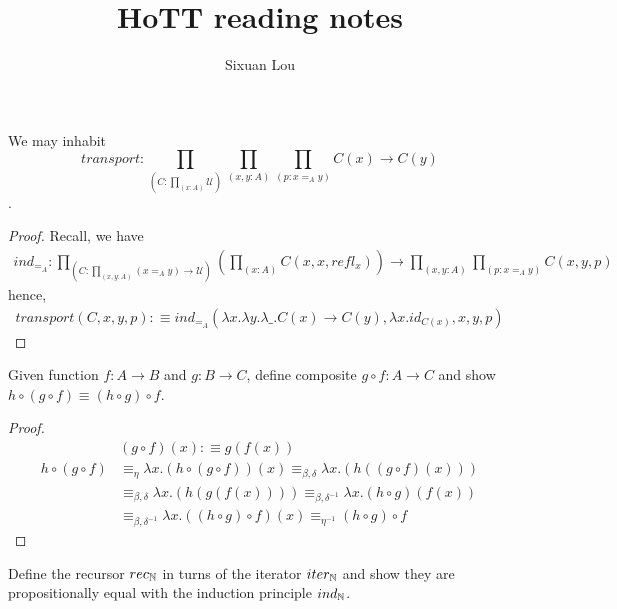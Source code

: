 \documentclass{article}
\begin{document}
\title{HoTT reading notes}
\author{Sixuan Lou}
\maketitle

\begin{lem}
  We may inhabit
  \[
    transport : \prod_{(C : \prod_{(x : A)} \mathcal{U})}\prod_{(x,y : A)} \prod_{(p : x =_A y)} C(x) \to C(y)
  \].
\end{lem}

\begin{proof}
  Recall, we have
  \begin{align*}
    ind_{=_A} : \prod_{(C : \prod_{(x,y : A)} (x =_A y) \to \mathcal{U})} \left( \textstyle \prod_{(x : A)} C(x,x,refl_x) \right) \to \prod_{(x,y : A)} \prod_{(p : x =_A y)} C(x,y,p)
  \end{align*}
  hence,
  \begin{align*}
    transport(C, x, y, p) :\equiv ind_{=_{A}}( \lambda x . \lambda y . \lambda \_ .  C(x) \to C(y) , \lambda x . id_{C(x)} , x, y, p )
  \end{align*}
\end{proof}


\begin{xprob}{1.1}
  Given function $f : A \to B$ and $g : B \to C$, define composite $g \circ f :
  A \to C$ and show $h \circ (g \circ f) \equiv (h \circ g) \circ f$.
\end{xprob}
\begin{proof}
  \begin{align*}
    & (g \circ f)(x) :\equiv g(f(x))\\
    h \circ (g \circ f)
    & \equiv_{\eta} \lambda x . (h \circ (g \circ f)) (x)
      \equiv_{\beta,\delta} \lambda x . (h ((g \circ f)(x)))\\
    & \equiv_{\beta,\delta} \lambda x . (h (g (f (x))))
      \equiv_{\beta,\delta^{-1}} \lambda x . (h \circ g)(f(x))\\
    & \equiv_{\beta,\delta^{-1}} \lambda x . ((h \circ g) \circ f)(x)
      \equiv_{\eta^{-1}} (h \circ g) \circ f
  \end{align*}
\end{proof}


\begin{xprob}{1.4}
  Define the recursor $rec_{\operatorname{\mathbb{N}}}$ in turns of the iterator $iter_{\operatorname{\mathbb{N}}}$ and show
  they are propositionally equal with the induction principle $ind_{\operatorname{\mathbb{N}}}$.
\end{xprob}
\end{document}

